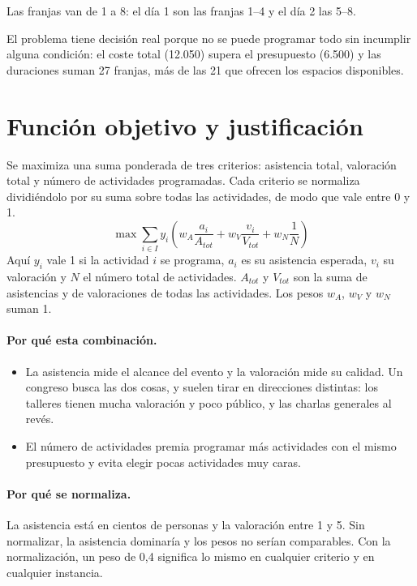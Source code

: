 Las franjas van de 1 a 8: el d\'ia 1 son las franjas 1--4 y el d\'ia 2 las 5--8.

El problema tiene decisi\'on real porque no se puede programar todo sin incumplir alguna condici\'on: el coste total (12.050) supera el presupuesto (6.500) y las duraciones suman 27 franjas, m\'as de las 21 que ofrecen los espacios disponibles.

\section{Funci\'on objetivo y justificaci\'on}
Se maximiza una suma ponderada de tres criterios: asistencia total, valoraci\'on total y n\'umero de actividades programadas. Cada criterio se normaliza dividi\'endolo por su suma sobre todas las actividades, de modo que vale entre 0 y 1.
\[
\max \sum_{i \in I} y_i \left( w_A \frac{a_i}{A_{tot}} + w_V \frac{v_i}{V_{tot}} + w_N \frac{1}{N} \right)
\]
Aqu\'i $y_i$ vale 1 si la actividad $i$ se programa, $a_i$ es su asistencia esperada, $v_i$ su valoraci\'on y $N$ el n\'umero total de actividades. $A_{tot}$ y $V_{tot}$ son la suma de asistencias y de valoraciones de todas las actividades. Los pesos $w_A$, $w_V$ y $w_N$ suman 1.

\paragraph{Por qu\'e esta combinaci\'on.}
\begin{itemize}[nosep]
\item La asistencia mide el alcance del evento y la valoraci\'on mide su calidad. Un congreso busca las dos cosas, y suelen tirar en direcciones distintas: los talleres tienen mucha valoraci\'on y poco p\'ublico, y las charlas generales al rev\'es.
\item El n\'umero de actividades premia programar m\'as actividades con el mismo presupuesto y evita elegir pocas actividades muy caras.
\end{itemize}

\paragraph{Por qu\'e se normaliza.} La asistencia est\'a en cientos de personas y la valoraci\'on entre 1 y 5. Sin normalizar, la asistencia dominar\'ia y los pesos no ser\'ian comparables. Con la normalizaci\'on, un peso de 0,4 significa lo mismo en cualquier criterio y en cualquier instancia.

